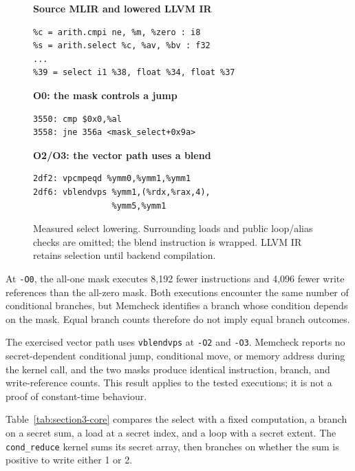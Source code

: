 \begin{figure}[!ht]
\centering
\begin{minipage}{0.97\columnwidth}
\footnotesize
\setlength{\topsep}{2pt}
\textbf{Source MLIR and lowered LLVM IR}
\begin{verbatim}
%c = arith.cmpi ne, %m, %zero : i8
%s = arith.select %c, %av, %bv : f32
...
%39 = select i1 %38, float %34, float %37
\end{verbatim}
\textbf{O0: the mask controls a jump}
\begin{verbatim}
3550: cmp $0x0,%al
3558: jne 356a <mask_select+0x9a>
\end{verbatim}
\textbf{O2/O3: the vector path uses a blend}
\begin{verbatim}
2df2: vpcmpeqd %ymm0,%ymm1,%ymm1
2df6: vblendvps %ymm1,(%rdx,%rax,4),
                %ymm5,%ymm1
\end{verbatim}
\end{minipage}
\caption{Measured select lowering. Surrounding loads and public loop/alias checks are omitted; the blend instruction is wrapped. LLVM IR retains selection until backend compilation.}
\label{fig:select-lowering}
\end{figure}

At \texttt{-O0}, the all-one mask executes 8,192 fewer instructions and 4,096 fewer write references than the all-zero mask.
Both executions encounter the same number of conditional branches, but Memcheck identifies a branch whose condition depends on the mask.
Equal branch counts therefore do not imply equal branch outcomes.

The exercised vector path uses \texttt{vblendvps} at \texttt{-O2} and \texttt{-O3}.
Memcheck reports no secret-dependent conditional jump, conditional move, or memory address during the kernel call, and the two masks produce identical instruction, branch, and write-reference counts.
This result applies to the tested executions; it is not a proof of constant-time behaviour.

Table~\ref{tab:section3-core} compares the select with a fixed computation, a branch on a secret sum, a load at a secret index, and a loop with a secret extent.
The \texttt{cond\_reduce} kernel sums its secret array, then branches on whether the sum is positive to write either 1 or 2.

